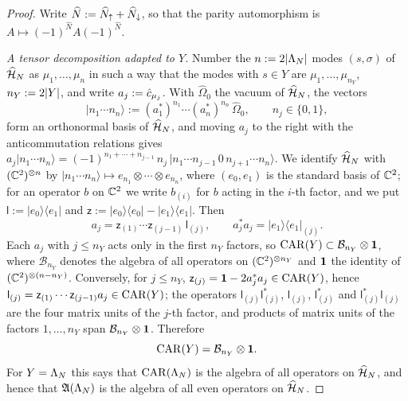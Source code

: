 \begin{proof}
Write $\widehat N:=\widehat{N}_{{\uparrow}}+\widehat{N}_{{\downarrow}}$, so that the parity automorphism is $A\mapsto(-1)^{\widehat N}A(-1)^{\widehat N}$.

\emph{A tensor decomposition adapted to $Y$.} Number the $n:=2\lvert\Lambda_N\rvert$ modes $(s,\sigma)$ of $\widehat{\mathcal{H}}_N$ as
$\mu_1,\dots,\mu_n$ in such a way that the modes with $s\in Y$ are $\mu_1,\dots,\mu_{n_Y}$, $n_Y:=2\lvert Y\rvert$, and write
$a_j:=\hat{c}_{\mu_j}$. With $\widehat\Omega_0$ the vacuum of $\widehat{\mathcal{H}}_N$, the vectors
\[
\lvert n_1\cdots n_n\rangle:=(a_1^*)^{n_1}\cdots(a_n^*)^{n_n}\,\widehat\Omega_0,\qquad n_j\in\{0,1\},
\]
form an orthonormal basis of $\widehat{\mathcal{H}}_N$, and moving $a_j$ to the right with the anticommutation relations gives
$a_j\lvert n_1\cdots n_n\rangle=(-1)^{n_1+\cdots+n_{j-1}}\,n_j\,\lvert n_1\cdots n_{j-1}\,0\,n_{j+1}\cdots n_n\rangle$. We
identify $\widehat{\mathcal{H}}_N$ with $(\mathbb{C}^2)^{\otimes n}$ by $\lvert n_1\cdots n_n\rangle\mapsto e_{n_1}\otimes\cdots\otimes e_{n_n}$,
where $(e_0,e_1)$ is the standard basis of $\mathbb{C}^2$; for an operator $b$ on $\mathbb{C}^2$ we write $b_{(i)}$ for $b$ acting
in the $i$-th factor, and we put $\mathsf l:=\lvert e_0\rangle\langle e_1\rvert$ and
$\mathsf z:=\lvert e_0\rangle\langle e_0\rvert-\lvert e_1\rangle\langle e_1\rvert$. Then
\[
a_j=\mathsf z_{(1)}\cdots\mathsf z_{(j-1)}\,\mathsf l_{(j)},\qquad a_j^*a_j=\lvert e_1\rangle\langle e_1\rvert_{(j)} .
\]
Each $a_j$ with $j\le n_Y$ acts only in the first $n_Y$ factors, so $\mathrm{CAR}(Y)\subset\mathcal B_{n_Y}\otimes\mathbf{1}$, where
$\mathcal B_{n_Y}$ denotes the algebra of all operators on $(\mathbb{C}^2)^{\otimes n_Y}$ and $\mathbf{1}$ the identity of
$(\mathbb{C}^2)^{\otimes(n-n_Y)}$. Conversely, for $j\le n_Y$, $\mathsf z_{(j)}=\mathbf{1}-2a_j^*a_j\in\mathrm{CAR}(Y)$, hence
$\mathsf l_{(j)}=\mathsf z_{(1)}\cdots\mathsf z_{(j-1)}a_j\in\mathrm{CAR}(Y)$; the operators $\mathsf l_{(j)}\mathsf l_{(j)}^*$,
$\mathsf l_{(j)}$, $\mathsf l_{(j)}^*$ and $\mathsf l_{(j)}^*\mathsf l_{(j)}$ are the four matrix units of the $j$-th
factor, and products of matrix units of the factors $1,\dots,n_Y$ span $\mathcal B_{n_Y}\otimes\mathbf{1}$. Therefore
\begin{equation}\label{eq:loc-JW}
\mathrm{CAR}(Y)=\mathcal B_{n_Y}\otimes\mathbf{1} .
\end{equation}
For $Y=\Lambda_N$ this says that $\mathrm{CAR}(\Lambda_N)$ is the algebra of all operators on $\widehat{\mathcal{H}}_N$, and hence that
$\mathfrak{A}(\Lambda_N)$ is the algebra of all even operators on $\widehat{\mathcal{H}}_N$.


\end{proof}
